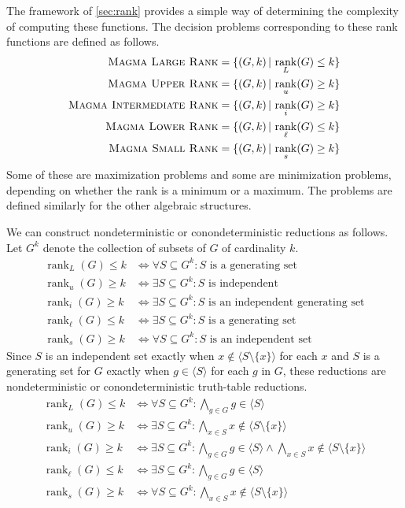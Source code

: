 \documentclass{article}
\newcommand{\gen}[1]{\langle #1 \rangle}
\DeclareMathOperator{\rank}{rank}
\begin{document}
The framework of \autoref{sec:rank} provides a simple way of determining the complexity of computing these functions.
The decision problems corresponding to these rank functions are defined as follows.
\begin{align*}
  \textsc{Magma Large Rank} & = \{ (G, k) \, | \, \rank_L(G) \leq k \} \\
  \textsc{Magma Upper Rank} & = \{ (G, k) \, | \, \rank_u(G) \geq k \} \\
  \textsc{Magma Intermediate Rank} & = \{ (G, k) \, | \, \rank_i(G) \geq k \} \\
  \textsc{Magma Lower Rank} & = \{ (G, k) \, | \, \rank_\ell(G) \leq k \} \\
  \textsc{Magma Small Rank} & = \{ (G, k) \, | \, \rank_s(G) \geq k \}
\end{align*}
Some of these are maximization problems and some are minimization problems, depending on whether the rank is a minimum or a maximum.
The problems are defined similarly for the other algebraic structures.

We can construct nondeterministic or conondeterministic reductions as follows.
Let $G^k$ denote the collection of subsets of $G$ of cardinality $k$.
\begin{align*}
  \rank_L(G) \leq k & \iff \forall S \subseteq G^k\colon S \text{ is a generating set} \\
  \rank_u(G) \geq k & \iff \exists S \subseteq G^k\colon S \text{ is independent} \\
  \rank_i(G) \geq k & \iff \exists S \subseteq G^k\colon S \text{ is an independent generating set} \\
  \rank_\ell(G) \leq k & \iff \exists S \subseteq G^k\colon S \text{ is a generating set} \\
  \rank_s(G) \geq k & \iff \forall S \subseteq G^k\colon S \text{ is an independent set}
\end{align*}
Since $S$ is an independent set exactly when $x \notin \gen{S \setminus \{x\}}$ for each $x$ and $S$ is a generating set for $G$ exactly when $g \in \gen{S}$ for each $g$ in $G$, these reductions are nondeterministic or conondeterministic truth-table reductions.
\begin{align*}
  \rank_L(G) \leq k & \iff \forall S \subseteq G^k\colon \bigwedge_{g \in G} g \in \gen{S} \\
  \rank_u(G) \geq k & \iff \exists S \subseteq G^k\colon \bigwedge_{x \in S} x \notin \gen{S \setminus \{x\}} \\
  \rank_i(G) \geq k & \iff \exists S \subseteq G^k\colon \bigwedge_{g \in G} g \in \gen{S} \land \bigwedge_{x \in S} x \notin \gen{S \setminus \{x\}} \\
  \rank_\ell(G) \leq k & \iff \exists S \subseteq G^k\colon \bigwedge_{g \in G} g \in \gen{S} \\
  \rank_s(G) \geq k & \iff \forall S \subseteq G^k\colon \bigwedge_{x \in S} x \notin \gen{S \setminus \{x\}}
\end{align*}
\end{document}
